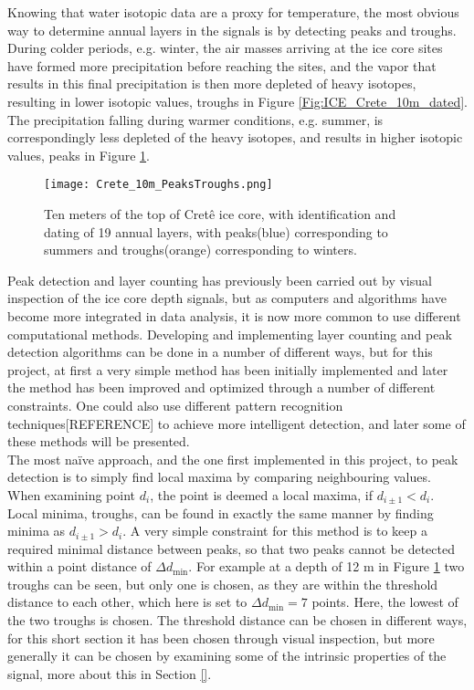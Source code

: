 \documentclass[../../CompleteThesis2/Complete_2ndDraft]{subfiles}
\begin{document}
Knowing that water isotopic data are a proxy for temperature, the most obvious way to determine annual layers in the signals is by detecting peaks and troughs. During colder periods, e.g. winter, the air masses arriving at the ice core sites have formed more precipitation before reaching the sites, and the vapor that results in this final precipitation is then more depleted of heavy isotopes, resulting in lower isotopic values, troughs in Figure \ref{Fig:ICE_Crete_10m_dated}. The precipitation falling during warmer conditions, e.g. summer, is correspondingly less depleted of the heavy isotopes, and results in higher isotopic values, peaks in Figure \ref{Fig:COMPMETH_Crete_10m_PeaksTroughs}.
\begin{figure}[h]
	\centering
	\texttt{[image: Crete\_10m\_PeaksTroughs.png]}
	\caption{Ten meters of the top of Cretê ice core, with identification and dating of 19 annual layers, with peaks(blue) corresponding to summers and troughs(orange) corresponding to winters.}
	\label{Fig:COMPMETH_Crete_10m_PeaksTroughs}
\end{figure}
Peak detection and layer counting has previously been carried out by visual inspection of the ice core depth signals, but as computers and algorithms have become more integrated in data analysis, it is now more common to use different computational methods. Developing and implementing layer counting and peak detection algorithms can be done in a number of different ways, but for this project, at first a very simple method has been initially implemented and later the method has been improved and optimized through a number of different constraints. One could also use different pattern recognition techniques[REFERENCE] to achieve more intelligent detection, and later some of these methods will be presented.\\
The most naïve approach, and the one first implemented in this project, to peak detection is to simply find local maxima by comparing neighbouring values. When examining point $d_i$, the point is deemed a local maxima, if $d_{i\pm1} < d_i$. Local minima, troughs, can be found in exactly the same manner by finding minima as $d_{i\pm1} > d_i$. A very simple constraint for this method is to keep a required minimal distance between peaks, so that two peaks cannot be detected within a point distance of $\Delta d_{\text{min}}$. For example at a depth of 12 m in Figure \ref{Fig:COMPMETH_Crete_10m_PeaksTroughs} two troughs can be seen, but only one is chosen, as they are within the threshold distance to each other, which here is set to $\Delta d_{\text{min}} = 7$ points. Here, the lowest of the two troughs is chosen. The threshold distance can be chosen in different ways, for this short section it has been chosen through visual inspection, but more generally it can be chosen by examining some of the intrinsic properties of the signal, more about this in Section \ref{}.
\end{document}

